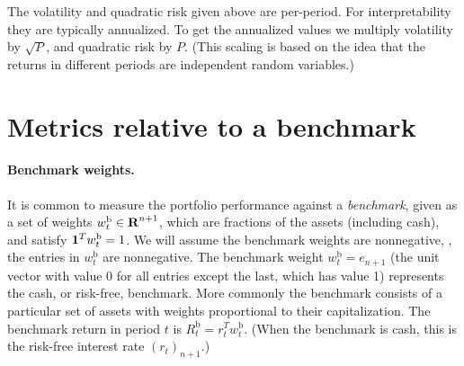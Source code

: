 \documentclass[openany]{article}  %
\newcommand{\Rb}{R^\mathrm{b}}
\newcommand{\wb}{w^\mathrm{b}}
\begin{document}
The volatility and quadratic risk given above are per-period. For interpretability
they are typically annualized.  To get the annualized values
we multiply volatility by $\sqrt P$, and quadratic risk by $P$.  (This scaling
is based on the idea that the returns in different periods are
independent random variables.)

\section{Metrics relative to a benchmark}
\label{s-relativemetrics}

\paragraph{Benchmark weights.}
It is common to measure the portfolio performance against a
\emph{benchmark}, given as a set of weights
$\wb_t \in \reals^{n+1}$, which are fractions of the assets (including cash),
and satisfy $\ones^T \wb_t=1$.
We will assume the benchmark weights are nonnegative, \ie,
the entries in $\wb_t$ are nonnegative.
The benchmark weight $\wb_t = e_{n+1}$
(the unit vector with value 0 for all entries
except the last, which has value 1) represents the cash, or risk-free, benchmark.
More commonly the benchmark consists of a particular set of assets
with weights proportional to their capitalization.
The benchmark return in period $t$ is $\Rb_t = r_t^T\wb_t$.
(When the benchmark is cash, this is the risk-free interest rate $(r_t)_{n+1}$.)
\end{document}
